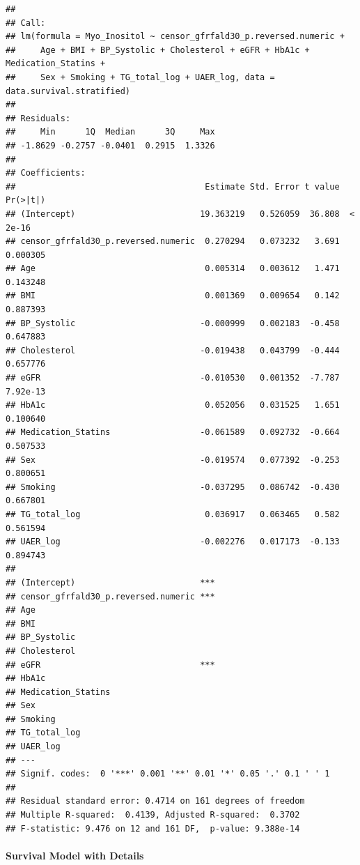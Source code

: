 \documentclass[]{article}
\let\oldparagraph\paragraph
\renewcommand{\paragraph}[1]{\oldparagraph{#1}\mbox{}}
\begin{document}
\begin{verbatim}
## 
## Call:
## lm(formula = Myo_Inositol ~ censor_gfrfald30_p.reversed.numeric + 
##     Age + BMI + BP_Systolic + Cholesterol + eGFR + HbA1c + Medication_Statins + 
##     Sex + Smoking + TG_total_log + UAER_log, data = data.survival.stratified)
## 
## Residuals:
##     Min      1Q  Median      3Q     Max 
## -1.8629 -0.2757 -0.0401  0.2915  1.3326 
## 
## Coefficients:
##                                      Estimate Std. Error t value Pr(>|t|)
## (Intercept)                         19.363219   0.526059  36.808  < 2e-16
## censor_gfrfald30_p.reversed.numeric  0.270294   0.073232   3.691 0.000305
## Age                                  0.005314   0.003612   1.471 0.143248
## BMI                                  0.001369   0.009654   0.142 0.887393
## BP_Systolic                         -0.000999   0.002183  -0.458 0.647883
## Cholesterol                         -0.019438   0.043799  -0.444 0.657776
## eGFR                                -0.010530   0.001352  -7.787 7.92e-13
## HbA1c                                0.052056   0.031525   1.651 0.100640
## Medication_Statins                  -0.061589   0.092732  -0.664 0.507533
## Sex                                 -0.019574   0.077392  -0.253 0.800651
## Smoking                             -0.037295   0.086742  -0.430 0.667801
## TG_total_log                         0.036917   0.063465   0.582 0.561594
## UAER_log                            -0.002276   0.017173  -0.133 0.894743
##                                        
## (Intercept)                         ***
## censor_gfrfald30_p.reversed.numeric ***
## Age                                    
## BMI                                    
## BP_Systolic                            
## Cholesterol                            
## eGFR                                ***
## HbA1c                                  
## Medication_Statins                     
## Sex                                    
## Smoking                                
## TG_total_log                           
## UAER_log                               
## ---
## Signif. codes:  0 '***' 0.001 '**' 0.01 '*' 0.05 '.' 0.1 ' ' 1
## 
## Residual standard error: 0.4714 on 161 degrees of freedom
## Multiple R-squared:  0.4139, Adjusted R-squared:  0.3702 
## F-statistic: 9.476 on 12 and 161 DF,  p-value: 9.388e-14
\end{verbatim}

\newpage

\hypertarget{survival-model-with-details-3}{%
\paragraph{Survival Model with
Details}\label{survival-model-with-details-3}}
\end{document}

